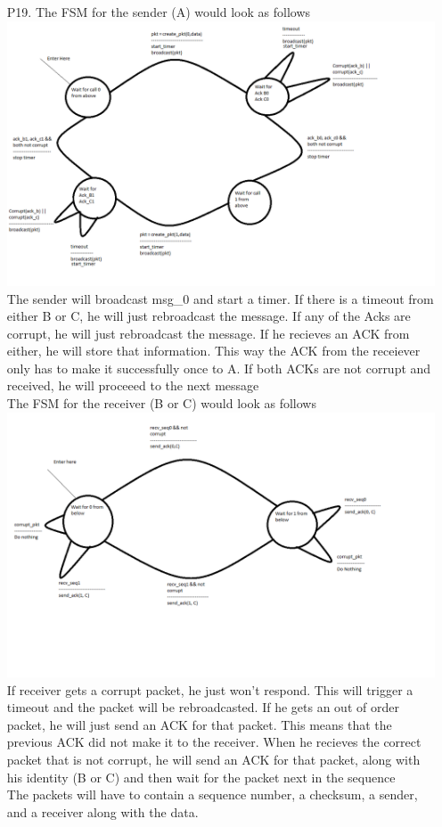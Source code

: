 \documentclass[11pt]{article}
\theoremstyle{definition}
\begin{document}
\begin{enumerate}
\item[P19.]
The FSM for the sender (A) would look as follows\\
\includegraphics[scale=0.5]{p20_sender}\\
The sender will broadcast msg\_0 and start a timer.  If there is a timeout from either B or C, he will just rebroadcast the message.  If any of the Acks are corrupt, he will just rebroadcast the message.  If he recieves an ACK from either, he will store that information.  This way the ACK from the receiever only has to make it successfully once to A.  If both ACKs are not corrupt and received, he will proceeed to the next message\\
\newline
The FSM for the receiver (B or C) would look as follows\\
\includegraphics[scale=0.4]{p20_recv}\\
If receiver gets a corrupt packet, he just won't respond.  This will trigger a timeout and the packet will be rebroadcasted.  If he gets an out of order packet, he will just send an ACK for that packet.  This means that the previous ACK did not make it to the receiver.  When he recieves the correct packet that is not corrupt, he will send an ACK for that packet, along with his identity (B or C) and then wait for the packet next in the sequence\\
The packets will have to contain a sequence number, a checksum, a sender, and a receiver along with the data.


\end{enumerate}
\end{document}
